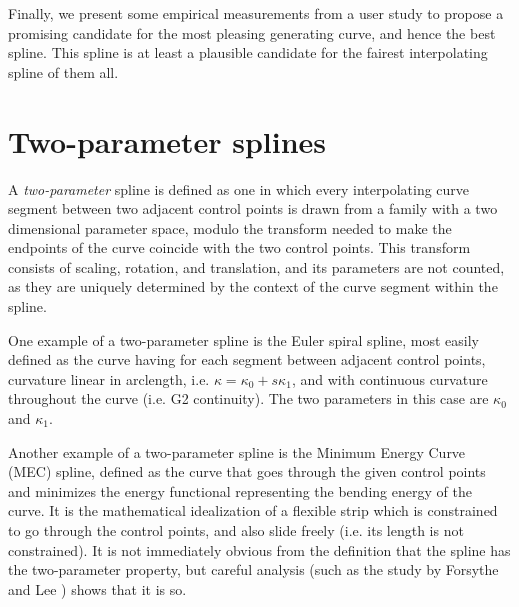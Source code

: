 \documentclass{article}
\begin{document}
Finally, we present some empirical measurements from a user study to
propose a promising candidate for the most pleasing generating curve,
and hence the best spline. This spline is at least a plausible
candidate for the fairest interpolating spline of them all.

%

\section{Two-parameter splines}
\label{sec-two-param}

A \emph{two-parameter} spline is defined as one in which every
interpolating curve segment between two adjacent control points is
drawn from a family with a two dimensional parameter space, modulo the
transform needed to make the endpoints of the curve coincide with the
two control points. This transform consists of scaling, rotation, and
translation, and its parameters are not counted, as they are uniquely
determined by the context of the curve segment within the spline.

One example of a two-parameter spline is the Euler spiral spline, most
easily defined as the curve having for each segment between adjacent
control points, curvature linear in arclength, i.e. $\kappa = \kappa_0
+ s\kappa_1$, and with continuous curvature throughout the curve
(i.e. G2 continuity). The two parameters in this case are $\kappa_0$
and $\kappa_1$.

Another example of a two-parameter spline is the Minimum Energy Curve
(MEC) spline, defined as the curve that goes through the given
control points and minimizes the energy functional representing the
bending energy of the curve. It is the mathematical idealization of a
flexible strip which is constrained to go through the control points,
and also slide freely (i.e. its length is not constrained). It is not
immediately obvious from the definition that the spline has the
two-parameter property, but careful analysis (such as the study by
Forsythe and Lee \cite{ForsytheLee}) shows that it is so.
\end{document}
